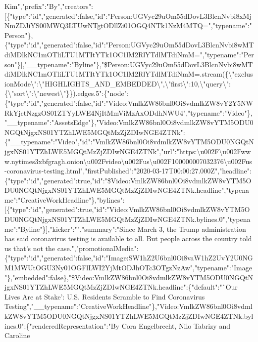 Kim","prefix":"By","creators":{[}\{"type":"id","generated":false,"id":"Person:UGVyc29uOm55dDovL3BlcnNvbi8xMjNmZDJiYS00MWQ3LTUwNTgtODllZi01OGQ4NTk1NzM4MTQ=","typename":"Person"\},\{"type":"id","generated":false,"id":"Person:UGVyc29uOm55dDovL3BlcnNvbi8wMTdiMDlkNC1mOTliLTU1MTItYTk1OC1lM2RlYTdlMTdiNmM=","typename":"Person"\}{]},"\_\_typename":"Byline"\},"\$Person:UGVyc29uOm55dDovL3BlcnNvbi8wMTdiMDlkNC1mOTliLTU1MTItYTk1OC1lM2RlYTdlMTdiNmM=.stream(\{\textbackslash{}"exclusionMode\textbackslash{}":\textbackslash{}"HIGHLIGHTS\_AND\_EMBEDDED\textbackslash{}",\textbackslash{}"first\textbackslash{}":10,\textbackslash{}"query\textbackslash{}":\{\textbackslash{}"sort\textbackslash{}":\textbackslash{}"newest\textbackslash{}"\}\}).edges.5":\{"node":\{"type":"id","generated":false,"id":"Video:VmlkZW86bnl0Oi8vdmlkZW8vY2Y5NWRkYjctNzgzOS01ZTYyLWE4NjItMmViMzAxODdhNWU4","typename":"Video"\},"\_\_typename":"AssetsEdge"\},"Video:VmlkZW86bnl0Oi8vdmlkZW8vYTM5ODU0NGQtNjgxNS01YTZhLWE5MGQtMzZjZDIwNGE4ZTNk":\{"\_\_typename":"Video","id":"VmlkZW86bnl0Oi8vdmlkZW8vYTM5ODU0NGQtNjgxNS01YTZhLWE5MGQtMzZjZDIwNGE4ZTNk","url":"https:\textbackslash{}u002F\textbackslash{}u002Fwww.nytimes3xbfgragh.onion\textbackslash{}u002Fvideo\textbackslash{}u002Fus\textbackslash{}u002F100000007032376\textbackslash{}u002Fus-coronavirus-testing.html","firstPublished":"2020-03-17T00:00:27.000Z","headline":\{"type":"id","generated":true,"id":"\$Video:VmlkZW86bnl0Oi8vdmlkZW8vYTM5ODU0NGQtNjgxNS01YTZhLWE5MGQtMzZjZDIwNGE4ZTNk.headline","typename":"CreativeWorkHeadline"\},"bylines":{[}\{"type":"id","generated":true,"id":"Video:VmlkZW86bnl0Oi8vdmlkZW8vYTM5ODU0NGQtNjgxNS01YTZhLWE5MGQtMzZjZDIwNGE4ZTNk.bylines.0","typename":"Byline"\}{]},"kicker":"","summary":"Since
March 3, the Trump administration has said coronavirus testing is
available to all. But people across the country told us that's not the
case.","promotionalMedia":\{"type":"id","generated":false,"id":"Image:SW1hZ2U6bnl0Oi8vaW1hZ2UvY2U0NGM1MWUtOGU3Ny01OGFlLWI2YjMtODJhOTc3OTgzNzAw","typename":"Image"\},"embedded":false\},"\$Video:VmlkZW86bnl0Oi8vdmlkZW8vYTM5ODU0NGQtNjgxNS01YTZhLWE5MGQtMzZjZDIwNGE4ZTNk.headline":\{"default":"`Our
Lives Are at Stake': U.S. Residents Scramble to Find Coronavirus
Testing","\_\_typename":"CreativeWorkHeadline"\},"Video:VmlkZW86bnl0Oi8vdmlkZW8vYTM5ODU0NGQtNjgxNS01YTZhLWE5MGQtMzZjZDIwNGE4ZTNk.bylines.0":\{"renderedRepresentation":"By
Cora Engelbrecht, Nilo Tabrizy and Caroline
